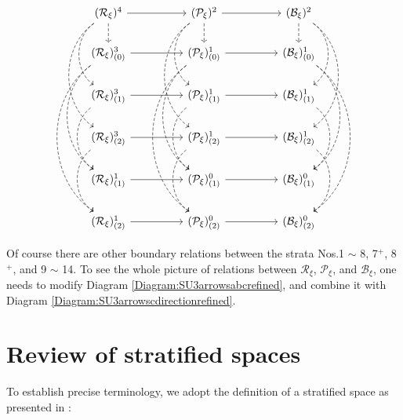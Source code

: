 \documentclass[12pt]{amsart}
\theoremstyle{definition}
\numberwithin{equation}{section}
\newcommand{\Reducedxi}{\mathcal{R}_\xi}
\newcommand{\Pxi}{\mathcal{P}_{\xi}}
\newcommand{\Bxi}{\mathcal{B}_{\xi}}
\begin{document}
{\begin{equation}
	\label{Diagram:SU3arrowscdirectionrefined}
	\begin{tikzcd}
		(\Reducedxi)^4  \arrow[ddd,bend right=55,dashed]\arrow[dd,bend right=55,dashed]\arrow[d,dashed] \arrow[rr] && (\Pxi)^2   \arrow[ddd,bend right=55,dashed]\arrow[dd,bend right=55,dashed]\arrow[d,dashed] \arrow[rr]   && (\Bxi)^2    \arrow[d,dashed] \arrow[dd,bend left=55,dashed]\arrow[ddd,bend left=55,dashed] \\
		(\Reducedxi)^3_{(0)}  
 \arrow[ddd,bend right=55,dashed] 
\arrow[dddd,bend right=55,dashed]\arrow[rr ] && (\Pxi)^1_{(0)} \arrow[ddd,bend right=55,dashed] 
\arrow[dddd,bend right=55,dashed] \arrow[rr ]&& (\Bxi)^1_{(0)}   \arrow[ddd,bend left=55,dashed]\arrow[dddd,bend left=55,dashed]\\  
		(\Reducedxi)^3_{(1)}  
 \arrow[dd,bend right=55,dashed] \arrow[rr ] && (\Pxi)^1_{(1)} \arrow[dd,bend right=55,dashed] \arrow[rr ]  && (\Bxi)^1_{(1)}   \arrow[dd,bend left=55,dashed]\\  
		(\Reducedxi)^3_{(2)}  
 \arrow[dd,bend right=55,dashed] 
 \arrow[rr ] && (\Pxi)^1_{(2)} \arrow[dd,bend right=55,dashed] \arrow[rr ]  && (\Bxi)^1_{(2)}   \arrow[dd,bend left=55,dashed]\\    
		(\Reducedxi)^1_{(1)}   \arrow[rr ] && (\Pxi)^0_{(1)}  \arrow[rr ]  && (\Bxi)^0_{(1)}    \\
		(\Reducedxi)^1_{(2)}  \arrow[rr ] && (\Pxi)^0_{(2)}  \arrow[rr ]  && (\Bxi)^0_{(2)}     
	\end{tikzcd}
\end{equation}

Of course there are other boundary relations between the strata Nos.1 $\sim$ 8, 7$^+$, 8$^+$, and   9 $\sim$ 14. To see the whole picture of relations between $\Reducedxi  $, $\Pxi $, and $\Bxi $, one needs to  modify Diagram \ref{Diagram:SU3arrowsabcrefined}, and combine it with Diagram \ref{Diagram:SU3arrowscdirectionrefined}. 

  

\appendix

\section{Review of stratified spaces}\label{Apd:stratifiedspace}

To establish precise terminology, we adopt the definition of a stratified space as presented in \cite{Pflaumbook, SLannals,PreSLstratifiedspace1,PreSLstratifiedspace2}:

}
\end{document}

